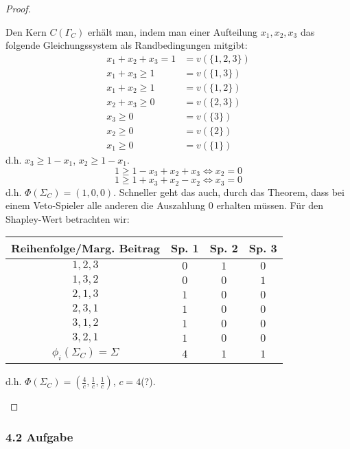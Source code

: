 \documentclass[12pt]{extreport} %
\theoremstyle{named}
\theoremstyle{itshape}
\theoremstyle{normal}
\begin{document}
\begin{enumerate}
\begin{proof}
\begin{enumerate}
			Den Kern $C(\Gamma_C)$ erhält man, indem man einer Aufteilung $x_1, x_2, x_3$ das folgende Gleichungssystem als Randbedingungen mitgibt:
			\begin{align*}
				x_{1} + x_{2} + x_{3} = 1 & = v(\{1, 2, 3 \}) \\
				x_{1} + x_{3} \geq 1 & = v(\{1, 3 \}) \\
				x_{1} + x_{2} \geq 1 & = v(\{ 1, 2 \}) \\
				x_{2} + x_{3} \geq 0 & = v(\{ 2, 3 \}) \\
				x_{3} \geq 0 & = v(\{ 3 \}) \\
			    x_{2} \geq 0 & = v(\{ 2 \}) \\
				x_{1} \geq 0 & = v(\{ 1 \})
			\end{align*}
			d.h. $x_{3} \geq 1 - x_{1}$, $x_{2} \geq 1- x_{1}$.
			$$ 1 \geq 1 - x_{3} + x_{2} + x_{3} \iff x_{2} = 0$$
			$$ 1 \geq 1 + x_{3} + x_{2} - x_{2} \iff x_{3} = 0$$
    		d.h. $\Phi(\Sigma_{C}) = \left(1, 0, 0 \right)$. Schneller geht das auch, durch das Theorem, dass bei einem Veto-Spieler alle anderen die Auszahlung $0$ erhalten müssen. Für den Shapley-Wert betrachten wir:
  			\begin{center}
    			\begin{tabular}{| c | c | c | c |}
   					\hline
    					Reihenfolge/Marg. Beitrag &  Sp. 1 & Sp. 2 & Sp. 3  \\ 
    						\hline
    					$1, 2, 3$ & $0$ & $1$ & $0$  \\ 
    						\hline
    					$1, 3, 2$ & $0$ & $0$ & $1$  \\
    						\hline
    					$2, 1, 3$ & $1$ & $0$ & $0$  \\
       						\hline
    					$2, 3, 1$ & $1$ & $0$ & $0$  \\
      						\hline
    					$3, 1, 2$ & $1$ & $0$ & $0$  \\
      						\hline
    					$3, 2, 1$ & $1$ & $0$ & $0$  \\
      						\hline \hline
    					$\phi_{i}(\Sigma_{C}) = \Sigma$  & $4$ & $1$ & $1$  \\
    				\hline
   				 \end{tabular}
    		\end{center}
    		d.h. $\Phi(\Sigma_{C}) = \left(\frac{4}{c}, \frac{1}{c}, \frac{1}{c} \right)$, $c = 4$(?).
		\end{enumerate}
	\end{proof}
\end{enumerate}

\subsubsection*{4.2 Aufgabe}
 
\end{document}
